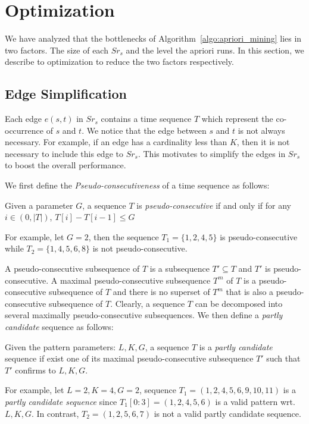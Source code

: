 \section{Optimization}
We have analyzed that the bottlenecks of Algorithm~\ref{algo:apriori_mining} 
lies in two factors. The size of each $Sr_s$ and the level the apriori runs.
In this section, we describe to optimization to reduce the two factors
respectively.

\subsection{Edge Simplification}
Each edge $e(s,t)$ in $Sr_s$ contains a time sequence $T$ 
which represent the co-occurrence of $s$ and $t$. We notice that the edge
between $s$ and $t$ is not always necessary. For example, if an edge has a
cardinality less than $K$, then it is not necessary to include this edge to $Sr_s$.
This motivates to simplify the edges in $Sr_s$ to boost the overall performance.

We first define the \emph{Pseudo-consecutiveness} of a time sequence as follows:
\begin{definition}
Given a parameter $G$, a sequence $T$ is \emph{pseudo-consecutive} if and only
if for any $i\in (0, |T|)$, $T[i] - T[i-1] \leq G$
\end{definition}
For example, let $G = 2$, then the sequence $T_1=\{1, 2, 4, 5\}$ is pseudo-consecutive
while $T_2=\{1,4,5,6,8\}$ is not pseudo-consecutive. 

A pseudo-consecutive subsequence of $T$ is a subsequence $T' \subseteq T$
and $T'$ is pseudo-consecutive. A maximal pseudo-consecutive subsequence 
$T^m$ of $T$ is a pseudo-consecutive subsequence of $T$ and there is 
no superset of $T^m$ that is also a pseudo-consecutive subsequence of $T$.
Clearly, a sequence $T$ can be decomposed into several maximally pseudo-consecutive 
subsequences. We then define a \emph{partly candidate} sequence as follows:

\begin{definition}
Given the pattern parameters: $L,K,G$, a sequence $T$ is 
a \emph{partly candidate} sequence if exist one of its maximal pseudo-consecutive
subsequence $T'$ such that $T'$ confirms to $L,K,G$.
\end{definition}

For example, let $L = 2, K = 4, G = 2$, sequence $T_1=(1,2,4,5,6,9,10,11)$ 
is a \emph{partly candidate sequence} since $T_1[0:3] = (1,2,4,5,6)$ is a valid
pattern wrt. $L,K,G$. In contrast, $T_2=(1,2,5,6,7)$ is not a valid partly candidate sequence.

